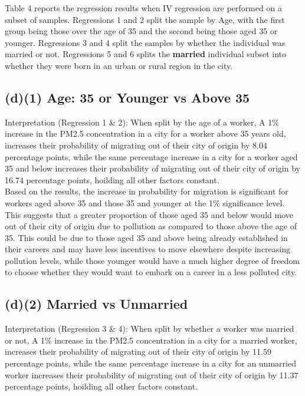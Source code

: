 \documentclass[11pt]{article}
\begin{document}
Table 4 reports the regression results when IV regression are performed on a subset of samples. Regressions 1 and 2 split the sample by Age, with the first group being those over the age of 35 and the second being those aged 35 or younger. Regressions 3 and 4 split the samples by whether the individual was married or not. Regressions 5 and 6 splits the \textbf{married} individual subset into whether they were born in an urban or rural region in the city. 
\subsection*{(d)(1) Age: 35 or Younger vs Above 35}
\noindent Interpretation (Regression 1 \& 2): When split by the age of a worker, A 1\% increase in the PM2.5 concentration in a city for a worker above 35 years old, increases their probability of migrating out of their city of origin by 8.04 percentage points, while the same percentage increase in a city for a worker aged 35 and below increases their probability of migrating out of their city of origin by 16.74 percentage points, hoilding all other factors constant.\\

\noindent Based on the results, the increase in probability for migration is significant for workers aged above 35 and those 35 and younger at the 1\% significance level. This suggests that a greater proportion of those aged 35 and below would move out of their city of origin due to pollution as compared to those above the age of 35. This could be due to those aged 35 and above being already established in their careers and may have less incentives to move elsewhere despite increasing pollution levels, while those younger would have a much higher degree of freedom to choose whether they would want to embark on a career in a less polluted city.

\subsection*{(d)(2) Married vs Unmarried}
\noindent Interpretation (Regression 3 \& 4): When split by whether a worker was married or not, A 1\% increase in the PM2.5 concentration in a city for a married worker, increases their probability of migrating out of their city of origin by 11.59 percentage points, while the same percentage increase in a city for an unmarried worker increases their probability of migrating out of their city of origin by 11.37 percentage points, hoilding all other factors constant.\\
\end{document}
